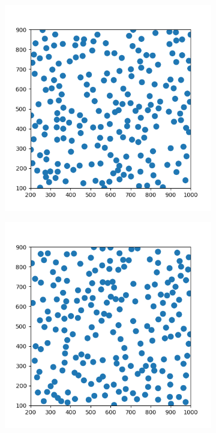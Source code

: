 \documentclass{article}
\begin{document}
\begin{figure}[h]
	\centering
	\begin{subfigure}[t]{0.33\linewidth}
		\centering
		\includegraphics[width = 1.0\linewidth, trim={20 20 20 20}, clip=true]{dmin1.png}
		\subcaption{}
		\label{fig:dmin1}	
	\end{subfigure}
	\hspace{0.12\linewidth}
	\begin{subfigure}[t]{0.33\linewidth}
		\centering
		\includegraphics[width = 1.0\linewidth, trim={20 20 20 20}, clip=true]{dmin2.png}

\end{subfigure}
\end{figure}
\end{document}
